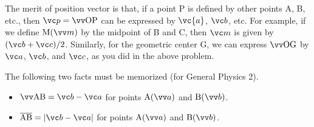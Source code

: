 \documentclass[11pt,pdfa,lastpage]{MishoNote}
\begin{document}
The merit of position vector is that, if a point P is defined by other points A, B, etc., then $\vc p=\vvv{OP}$ can be expressed by $\vc{a}$, $\vc b$, etc.
For example, if we define $\posvec Mm$ by the midpoint of B and C, then $\vc m$ is given by $(\vc b+\vc c)/2$. Similarly, for the geometric center G, we can express $\vvv{OG}$ by $\vc a$, $\vc b$, and $\vc c$, as you did in the above problem.

The following two facts must be  memorized (for General Physics 2).
\begin{itemize}
  \item $\vvv{AB}=\vc b-\vc a$ for points $\posvec Aa$ and $\posvec Bb$.
  \item $\plen{AB}=|\vc b-\vc a|$ for points $\posvec Aa$ and $\posvec Bb$.
\end{itemize}
\end{document}
